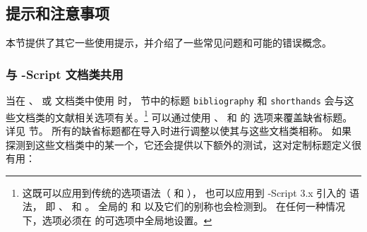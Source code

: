 \subsection{提示和注意事项}
\label{use:cav}

本节提供了其它一些使用提示，并介绍了一些常见问题和可能的错误概念。

\subsubsection{与 -Script 文档类共用}
\label{use:cav:scr}


当在 、 或  文档类中使用 \biblatex 时，
 节中的标题 \texttt{bibliography} 和 \texttt{shorthands} 会与这些文档类的文献相关选项有关。\footnote{%
	这既可以应用到传统的选项语法（ 和 ），
	也可以应用到 -Script 3.x 引入的 \keyval 语法，
	即 、 和 。
	全局的  和  以及它们的别称也会检测到。
	在任何一种情况下，选项必须在  的可选项中全局地设置。
}
可以通过使用 、 和  的  选项来覆盖缺省标题。
详见  节。
所有的缺省标题都在导入时进行调整以使其与这些文档类相称。
如果 \biblatex 探测到这些文档类中的某一个，它还会提供以下额外的测试，这对定制标题定义很有用：

